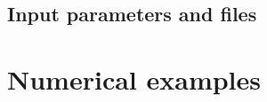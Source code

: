 \documentclass{gnulike}
\begin{document}
\section{Input parameters and files}

\chapter{Numerical examples}

\begin{appendices}


\end{appendices}
  



\clearpage
\newpage
\thispagestyle{empty}
\printindex
\end{document}

